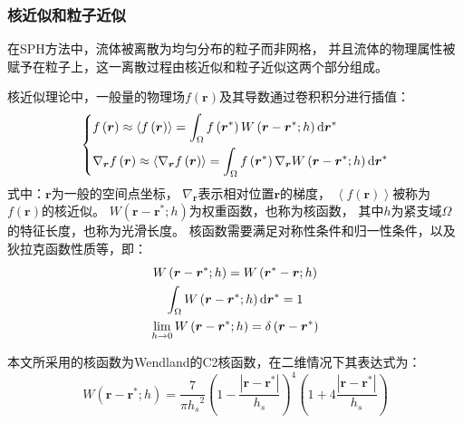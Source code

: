\subsubsection{
  \texorpdfstring{核近似和粒子近似} %
  {\thesubsubsection 核近似和粒子近似} %
}
\label{sssec:核近似和粒子近似}

在SPH方法中，流体被离散为均匀分布的粒子而非网格，%
并且流体的物理属性被赋予在粒子上，这一离散过程由核近似和粒子近似这两个部分组成。%

核近似理论中，一般量的物理场$f\left(\bm{r}\right)$及其导数通过卷积积分进行插值：
\begin{equation}
  \left\{
    \begin{aligned}
      & f\left(\bm{r}\right) \approx \left\langle f\left(\bm{r}\right)\right\rangle %
      = \int_{\Omega} f\left(\bm{r}^{*}\right) W\left(\bm{r} - \bm{r}^{*}; h\right) {\rm{d}} \bm{r}^{*} \\
      & \nabla_{\bm{r}} f\left(\bm{r}\right) \approx \left\langle \nabla_{\bm{r}} f\left(\bm{r}\right)\right\rangle %
      = \int_{\Omega} f\left(\bm{r}^{*}\right) \nabla_{\bm{r}} W\left(\bm{r} - \bm{r}^{*}; h\right) {\rm{d}} \bm{r}^{*} 
    \end{aligned}
  \right.
\end{equation}
式中：$\bm{r}$为一般的空间点坐标， $\nabla_{\bm{r}}$表示相对位置$\bm{r}$的梯度，%
$\left\langle f\left(\bm{r}\right)\right\rangle$被称为$f\left(\bm{r}\right)$的核近似。%
$W\left(\bm{r} - \bm{r}^{*}; h\right)$为权重函数，也称为核函数，%
其中$h$为紧支域$\Omega$的特征长度，也称为光滑长度。%
核函数需要满足对称性条件和归一性条件，以及狄拉克函数性质等\cite{liuSmoothedParticleHydrodynamics2003}，即：
\begin{subequations}
  \begin{gather}
    W\left( \bm{r}-{\bm{r}^{*}};h \right) %
    = W\left( {\bm{r}^{*}}-\bm{r};h \right) \label{eq:SPH-kernel-symmetry}\\ 
    \int_{\Omega}{W\left( \bm{r}-{\bm{r}^{*}};h \right)%
    {\rm{d}}{\bm{r}^{*}}} = 1 \label{eq:SPH-kernel-normalization} \\ 
    \lim_{h \to 0} W\left( \bm{r}-{\bm{r}^{*}};h \right) %
    = \delta \left( \bm{r}-{\bm{r}^{*}} \right) \label{eq:SPH-kernel-dirac}
  \end{gather} 
\end{subequations}

本文所采用的核函数为Wendland的C2核函数\cite{wendlandPiecewisePolynomialPositive1995}，在二维情况下其表达式为：
\begin{equation}
  W\left( \bm{r}-{\bm{r}^{*}};h \right) %
  = \frac{7}{\pi {{h}_{s}}^2}{{\left( 1-\frac{\left| \bm{r}-{\bm{r}^{*}} \right|}{{{h}_{s}}} \right)}^{4}} %
  \left( 1+4\frac{\left| \bm{r}-{\bm{r}^{*}} \right|}{{{h}_{s}}} \right)
\end{equation}

